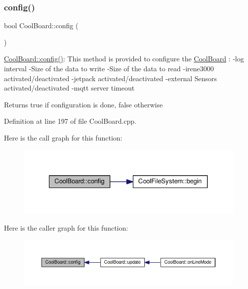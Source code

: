 \subsubsection{\texorpdfstring{config()}{config()}}
{\footnotesize\ttfamily bool Cool\+Board\+::config (\begin{DoxyParamCaption}{ }\end{DoxyParamCaption})}

\hyperlink{class_cool_board_a583a874c09c07e70a6eb9229fc4beddb}{Cool\+Board\+::config()}\+: This method is provided to configure the \hyperlink{class_cool_board}{Cool\+Board} \+: -\/log interval -\/\+Size of the data to write -\/\+Size of the data to read -\/irene3000 activated/deactivated -\/jetpack activated/deactivated -\/external Sensors activated/deactivated -\/mqtt server timeout

\begin{DoxyReturn}{Returns}
true if configuration is done, false otherwise 
\end{DoxyReturn}


Definition at line 197 of file Cool\+Board.\+cpp.

Here is the call graph for this function\+:\nopagebreak
\begin{figure}[H]
\begin{center}
\leavevmode
\includegraphics[width=327pt]{class_cool_board_a583a874c09c07e70a6eb9229fc4beddb_cgraph}
\end{center}
\end{figure}
Here is the caller graph for this function\+:\nopagebreak
\begin{figure}[H]
\begin{center}
\leavevmode
\includegraphics[width=350pt]{class_cool_board_a583a874c09c07e70a6eb9229fc4beddb_icgraph}
\end{center}
\end{figure}
\mbox{\label{class_cool_board_a519de78b807f8ec6463ff484eb925918}} 
